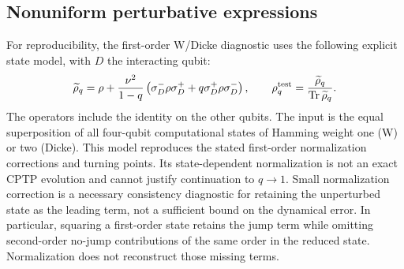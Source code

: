\documentclass[pdflatex,sn-mathphys-num]{sn-jnl}
\newcommand{\Tr}{\operatorname{Tr}}
\begin{document}
\subsection{Nonuniform perturbative expressions}
For reproducibility, the first-order W/Dicke diagnostic uses the following explicit state model, with $D$ the interacting qubit:
\begin{equation}
\widetilde\rho_q=\rho+\frac{\nu^2}{1-q}
\left(\sigma_D^-\rho\sigma_D^++q\sigma_D^+\rho\sigma_D^-\right),\qquad
\rho_q^{\rm test}=\frac{\widetilde\rho_q}{\Tr\widetilde\rho_q}.
\label{eq:first-order-diagnostic-model}
\end{equation}
The operators include the identity on the other qubits. The input is the equal superposition of all four-qubit computational states of Hamming weight one (W) or two (Dicke). This model reproduces the stated first-order normalization corrections and turning points. Its state-dependent normalization is not an exact CPTP evolution and cannot justify continuation to $q\to1$. Small normalization correction is a necessary consistency diagnostic for retaining the unperturbed state as the leading term, not a sufficient bound on the dynamical error. In particular, squaring a first-order state retains the jump term while omitting second-order no-jump contributions of the same order in the reduced state. Normalization does not reconstruct those missing terms.
\end{document}
